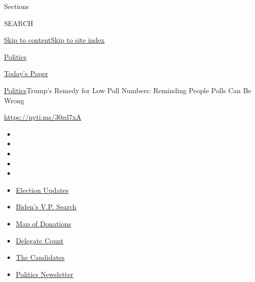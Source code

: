 Sections

SEARCH

\protect\hyperlink{site-content}{Skip to
content}\protect\hyperlink{site-index}{Skip to site index}

\href{https://www.nytimes.com/section/politics}{Politics}

\href{https://myaccount.nytimes.com/auth/login?response_type=cookie\&client_id=vi}{}

\href{https://www.nytimes.com/section/todayspaper}{Today's Paper}

\href{/section/politics}{Politics}\textbar{}Trump's Remedy for Low Poll
Numbers: Reminding People Polls Can Be Wrong

\url{https://nyti.ms/30zd7xA}

\begin{itemize}
\item
\item
\item
\item
\item
\end{itemize}

\begin{itemize}
\item
  \href{https://www.nytimes.com/2020/07/31/us/elections/biden-vs-trump.html?action=click\&pgtype=Article\&state=default\&region=TOP_BANNER\&context=storylines_menu}{Election
  Updates}
\item
  \href{https://www.nytimes.com/article/biden-vice-president-2020.html?action=click\&pgtype=Article\&state=default\&region=TOP_BANNER\&context=storylines_menu}{Biden's
  V.P. Search}
\item
  \href{https://www.nytimes.com/interactive/2020/07/24/us/politics/trump-biden-campaign-donors.html?action=click\&pgtype=Article\&state=default\&region=TOP_BANNER\&context=storylines_menu}{Map
  of Donations}
\item
  \href{https://www.nytimes.com/interactive/2020/us/elections/delegate-count-primary-results.html?action=click\&pgtype=Article\&state=default\&region=TOP_BANNER\&context=storylines_menu}{Delegate
  Count}
\item
  \href{https://www.nytimes.com/interactive/2019/us/politics/2020-presidential-candidates.html?action=click\&pgtype=Article\&state=default\&region=TOP_BANNER\&context=storylines_menu}{The
  Candidates}
\item
  \href{https://www.nytimes.com/newsletters/politics?action=click\&pgtype=Article\&state=default\&region=TOP_BANNER\&context=storylines_menu}{Politics
  Newsletter}
\end{itemize}

